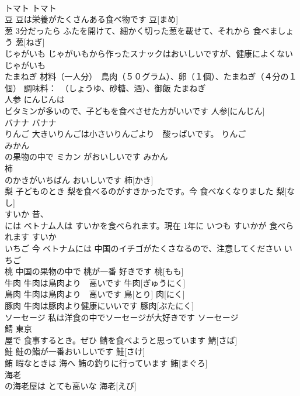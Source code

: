 \documentclass[8pt]{extreport}
\begin{document}
\begin{CJK}{UTF8}{min}
\\	トマト		トマト					
\\	豆	豆は栄養がたくさんある食べ物です	豆[まめ]					
\\	葱	3分だったら ふたを開けて、細かく切った葱を載せて、それから 食べましょう	葱[ねぎ]					
\\	じゃがいも	じゃがいもから作ったスナックはおいしいですが、健康によくない	じゃがいも						
\\	たまねぎ	材料（一人分）　鳥肉（５０グラム）、卵（１個）、たまねぎ（４分の１
\\	個） 調味料：　（しょうゆ、砂糖、酒）、御飯	たまねぎ						
\\	人参	にんじんは 
\\	ビタミンが多いので、子どもを食べさせた方がいいです	人参[にんじん]						
\\	バナナ		バナナ						
\\	りんご	大きいりんごは小さいりんごより　酸っぱいです。	りんご						
\\	みかん	
\\	の果物の中で ミカン がおいしいです	みかん						
\\	柿	
\\	のかきがいちばん おいしいです	柿[かき]						
\\	梨	子どものとき 梨を食べるのがすきかったです。今 食べなくなりました	梨[なし]						
\\	すいか	昔、
\\	には ベトナム人は すいかを食べられます。現在 1年に いつも すいかが 食べられます	すいか						
\\	いちご	今 ベトナムには 中国のイチゴがたくさなるので、注意してください	いちご						
\\	桃	中国の果物の中で 桃が一番 好きです	桃[もも]					
\\	牛肉	牛肉は鳥肉より　高いです	牛肉[ぎゅうにく]						
\\	鳥肉	牛肉は鳥肉より　高いです	鳥[とり] 肉[にく]						
\\	豚肉	牛肉は豚肉より健康にいいです	豚肉[ぶたにく]					
\\	ソーセージ	私は洋食の中でソーセージが大好きです	ソーセージ						
\\	鯖	東京
\\	屋で 食事するとき。ぜひ 鯖を食べようと思っています	鯖[さば]			
\\	鮭	鮭の鮨が一番おいしいです	鮭[さけ]			
\\	鮪	暇なときは 海へ 鮪の釣りに行っています	鮪[まぐろ]			
\\	海老	
\\	の海老屋は とても高いな	海老[えび]			

\end{CJK}
\end{document}
